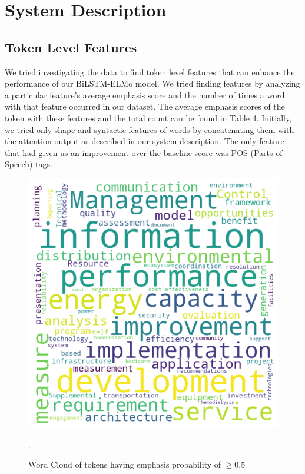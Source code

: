 \documentclass[letterpaper]{article} %
\begin{document}
\section{System Description}
\subsection{Token Level Features}

We tried investigating the data to find token level features that can enhance the performance of our BiLSTM-ELMo model. We tried finding features by analyzing a particular feature's average emphasis score and the number of times a word with that feature occurred in our dataset. The average emphasis scores of the token with these features and the total count can be found in Table 4. Initially, we tried only shape and syntactic features of words by concatenating them with the attention output as described in our system description. The only feature that had given us an improvement over the baseline score was POS (Parts of Speech) tags.

\begin{figure}[h!]
\centering
\includegraphics[width=0.8\columnwidth]{word_cloud.png} %
\caption{Word Cloud of tokens having emphasis probability of $\geq0.5$}.
\label{fig1}
\end{figure}
\end{document}

